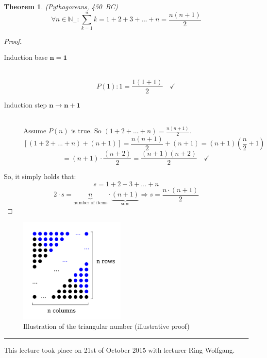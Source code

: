\documentclass[a4paper,landscape,twocolumn]{article}
\newtheorem{theorem}{Theorem}
\newcommand\meta[3]{\hrule{} This #1 took place on #2 with lecturer #3.\par}
\begin{document}
\begin{theorem} (Pythagoreans, 450~BC)
  \[ \forall n \in \mathbb N_+: \sum_{k=1}^n k = 1 + 2 + 3 + \dots + n = \frac{n (n+1)}{2} \]
\end{theorem}
\begin{proof}
  \begin{description}
    \item[Induction base $\mathbf{n = 1}$] \hfill{} \\
      \[ P(1): 1 = \frac{1 (1+1)}{2} \quad\checkmark \]
    \item[Induction step $\mathbf{n \rightarrow n + 1}$] \hfill{} \\
      Assume $P(n)$ is true.
      So $(1 + 2 + \dots + n) = \frac{n (n+1)}{2}$.
      \[ \left[(1 + 2 + \dots + n) + (n + 1)\right] = \frac{n(n+1)}{2} + (n+1) = (n+1) \left(\frac n2 + 1\right) \]
      \[ = (n+1) \cdot \frac{(n+2)}{2} = \frac{(n+1)(n+2)}{2} \quad\checkmark \]
  \end{description}

  So, it simply holds that:
  \[ s = 1 + 2 + 3 + \dots + n \]
  \[ 2 \cdot s = \underbrace{n}_{\text{number of items}} \cdot \underbrace{(n + 1)}_{\text{sum}} \Rightarrow s = \frac{n \cdot (n + 1)}{2} \]
\end{proof}

\begin{figure}[!h]
  \begin{center}
    \includegraphics[width=200px]{img/triangular_number.pdf}
    \caption{Illustration of the triangular number (illustrative proof)}
  \end{center}
\end{figure}

\meta{lecture}{21st of October 2015}{Ring Wolfgang}
\end{document}
